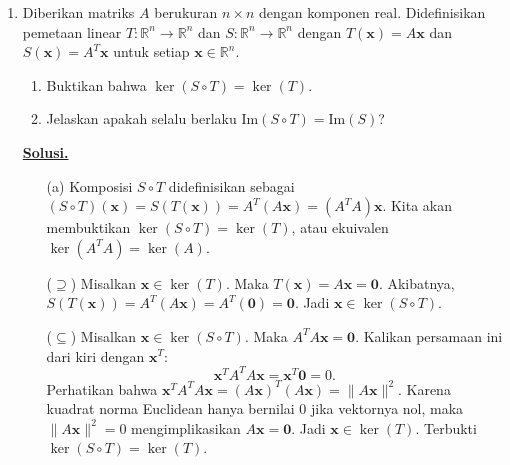 \documentclass[12pt,twoside]{article}
\newenvironment{solution}
{
	\par\noindent\textbf{\underline{Solusi.}}\\
}
{
	\par
}
\begin{document}
\begin{enumerate}
\begin{solution}
          $(b) \implies (a)$:
          Kita buktikan menggunakan kontraposisi. Asumsikan $n$ dan $k$ tidak relatif prima.
          Misalkan $d = \text{fpb}(n, k) > 1$. Maka terdapat bilangan prima $p$ yang membagi $d$.
          Jadi $p \mid n$ dan $p \mid k$.
          Karena $p$ membagi orde grup $G$ ($|G|=n$), menurut Teorema Cauchy, terdapat elemen $y \in G$ dengan orde $p$ (sehingga $y \neq e$, tetapi $y^p = e$).
          Pilih subgrup $H = \{e\}$.
          Tinjau himpunan $S = \{x \in G \mid x^k \in H\} = \{x \in G \mid x^k = e\}$.
          Periksa elemen $y$ yang kita temukan tadi. Kita hitung $y^k$.
          Karena $p \mid k$, kita bisa menulis $k = pm$ untuk suatu bilangan bulat $m$.
          \[ y^k = y^{pm} = (y^p)^m = e^m = e. \]
          Jadi $y \in S$. Namun, $y \neq e$, sehingga $y \notin H$.
          Hal ini menunjukkan $S \not\subseteq H$.
          Kontradiksi dengan pernyataan (b).
          Oleh karena itu, asumsi awal salah, dan haruslah $\text{fpb}(n, k) = 1$.
        \end{solution}
  \item Diberikan matriks $A$ berukuran $n\times n$ dengan komponen real. Didefinisikan pemetaan linear $T:\mathbb{R}^n\rightarrow \mathbb{R}^n$ dan $S:\mathbb{R}^n\rightarrow\mathbb{R}^n$ dengan $T(\mathbf{x})=A\mathbf{x}$ dan $S(\mathbf{x})=A^T\mathbf{x}$ untuk setiap $\mathbf{x}\in \mathbb{R}^n$.
        \begin{enumerate}
          \item Buktikan bahwa $\ker (S\circ T)=\ker (T)$.
          \item Jelaskan apakah selalu berlaku $\text{Im}(S\circ T)=\text{Im}(S)$?
        \end{enumerate}

        \begin{solution}
          \begin{enumerate}
            \item[(a)] Komposisi $S \circ T$ didefinisikan sebagai $(S \circ T)(\mathbf{x}) = S(T(\mathbf{x})) = A^T(A\mathbf{x}) = (A^T A)\mathbf{x}$.
                  Kita akan membuktikan $\ker(S \circ T) = \ker(T)$, atau ekuivalen $\ker(A^T A) = \ker(A)$.

                  ($\supseteq$) Misalkan $\mathbf{x} \in \ker(T)$. Maka $T(\mathbf{x}) = A\mathbf{x} = \mathbf{0}$.
                  Akibatnya, $S(T(\mathbf{x})) = A^T(A\mathbf{x}) = A^T(\mathbf{0}) = \mathbf{0}$.
                  Jadi $\mathbf{x} \in \ker(S \circ T)$.

                  ($\subseteq$) Misalkan $\mathbf{x} \in \ker(S \circ T)$. Maka $A^T A \mathbf{x} = \mathbf{0}$.
                  Kalikan persamaan ini dari kiri dengan $\mathbf{x}^T$:
                  \[ \mathbf{x}^T A^T A \mathbf{x} = \mathbf{x}^T \mathbf{0} = 0. \]
                  Perhatikan bahwa $\mathbf{x}^T A^T A \mathbf{x} = (A\mathbf{x})^T (A\mathbf{x}) = \|A\mathbf{x}\|^2$.
                  Karena kuadrat norma Euclidean hanya bernilai 0 jika vektornya nol, maka $\|A\mathbf{x}\|^2 = 0$ mengimplikasikan $A\mathbf{x} = \mathbf{0}$.
                  Jadi $\mathbf{x} \in \ker(T)$.
                  Terbukti $\ker(S \circ T) = \ker(T)$.


\end{enumerate}
\end{solution}
\end{enumerate}
\end{document}
